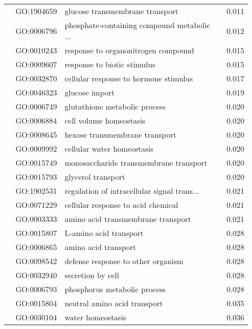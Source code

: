 \begin{longtable}{lllr}
   & GO:1904659 &              glucose transmembrane transport &         0.011 \\
   & GO:0006796 &  phosphate-containing compound metabolic ... &         0.012 \\
   & GO:0010243 &          response to organonitrogen compound &         0.015 \\
   & GO:0009607 &                  response to biotic stimulus &         0.015 \\
   & GO:0032870 &        cellular response to hormone stimulus &         0.017 \\
   & GO:0046323 &                               glucose import &         0.019 \\
   & GO:0006749 &                glutathione metabolic process &         0.020 \\
   & GO:0006884 &                      cell volume homeostasis &         0.020 \\
   & GO:0008645 &               hexose transmembrane transport &         0.020 \\
   & GO:0009992 &                   cellular water homeostasis &         0.020 \\
   & GO:0015749 &       monosaccharide transmembrane transport &         0.020 \\
   & GO:0015793 &                           glycerol transport &         0.020 \\
   & GO:1902531 &  regulation of intracellular signal trans... &         0.021 \\
   & GO:0071229 &           cellular response to acid chemical &         0.021 \\
   & GO:0003333 &           amino acid transmembrane transport &         0.021 \\
   & GO:0015807 &                       L-amino acid transport &         0.028 \\
   & GO:0006865 &                         amino acid transport &         0.028 \\
   & GO:0098542 &           defense response to other organism &         0.028 \\
   & GO:0032940 &                            secretion by cell &         0.028 \\
   & GO:0006793 &                 phosphorus metabolic process &         0.028 \\
   & GO:0015804 &                 neutral amino acid transport &         0.035 \\
   & GO:0030104 &                            water homeostasis &         0.036 \\

\end{longtable}
